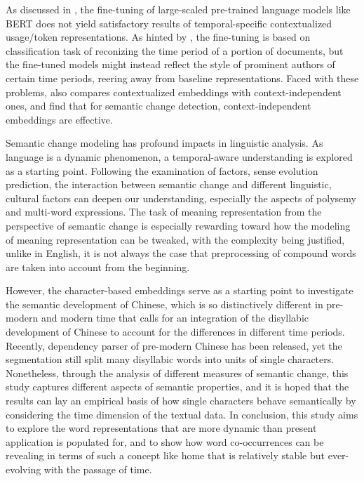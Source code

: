 As discussed in \textcite{giulianelli2019lexical}, the fine-tuning of large-scaled pre-trained language models like BERT does not yield satisfactory results of temporal-specific contextualized usage/token representations. As hinted by \textcite{giulianelli2019lexical}, the fine-tuning is based on classification task of reconizing the time period of a portion of documents, but the fine-tuned models might instead reflect the style of prominent authors of certain time periods, reering away from baseline representations. Faced with these problems, \textcite{kutuzov2020uio} also compares contextualized embeddings with context-independent ones, and find that for semantic change detection, context-independent embeddings are effective.

Semantic change modeling has profound impacts in linguistic analysis. As language is a dynamic phenomenon, a temporal-aware understanding is explored as a starting point. Following the examination of factors, sense evolution prediction, the interaction between semantic change and different linguistic, cultural factors can deepen our understanding, especially the aspects of polysemy and multi-word expressions. The task of meaning representation from the perspective of semantic change is especially rewarding toward how the modeling of meaning representation can be tweaked, with the complexity being justified, unlike in English, it is not always the case that preprocessing of compound words are taken into account from the beginning.

However, the character-based embeddings serve as a starting point to investigate the semantic development of Chinese, which is so distinctively different in pre-modern and modern time that calls for an integration of the disyllabic development of Chinese to account for the differences in different time periods. Recently, dependency parser of pre-modern Chinese has been released, yet the segmentation still split many disyllabic words into units of single characters. Nonetheless, through the analysis of different measures of semantic change, this study captures different aspects of semantic properties, and it is hoped that the results can lay an empirical basis of how single characters behave semantically by considering the time dimension of the textual data. In conclusion, this study aims to explore the word representations that are more dynamic than present application is populated for, and to show how word co-occurrences can be revealing in terms of such a concept like home that is relatively stable but ever-evolving with the passage of time.


